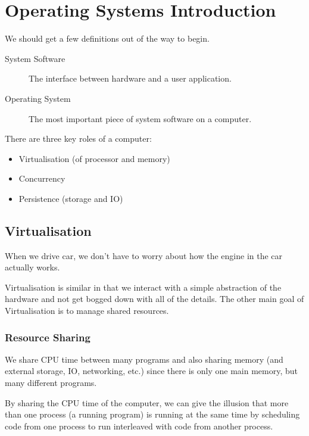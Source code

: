 \section{Operating Systems Introduction}\label{sec:operating_systems_introduction}
\begin{note}
    We should get a few definitions out of the way to begin.
    \begin{description}
        \item[System Software] The interface between hardware and a user application.
        \item[Operating System] The most important piece of system software on a computer.
    \end{description}
\end{note}
\noindent
There are three key roles of a computer:
\begin{itemize}
    \item Virtualisation (of processor and memory)
    \item Concurrency
    \item Persistence (storage and IO)
\end{itemize}

\subsection{Virtualisation}\label{sub:virtualisation}

When we drive car, we don't have to worry about how the engine in the car actually works.

Virtualisation is similar in that we interact with a simple abstraction of the hardware and not get bogged down with all of the details.
The other main goal of Virtualisation is to manage shared resources.

\subsubsection{Resource Sharing}\label{ssub:resource_sharing}

We share CPU time between many programs and also sharing memory (and external storage, IO, networking, etc.) since there is only one main memory, but many different programs.

By sharing the CPU time of the computer, we can give the illusion that more than one process (a running program) is running at the same time by scheduling code from one process to run interleaved with code from another process.

